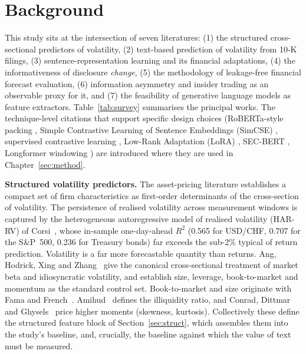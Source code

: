 \documentclass[logo,msc,ai]{infthesis}        %
\begin{document}
\chapter{Background}
\label{sec:sota}
This study sits at the intersection of seven literatures: (1) the structured cross-sectional predictors of volatility, (2) text-based prediction of volatility from 10-K filings, (3) sentence-representation learning and its financial adaptations, (4) the informativeness of disclosure \emph{change}, (5) the methodology of leakage-free financial forecast evaluation, (6) information asymmetry and insider trading as an observable proxy for it, and (7) the feasibility of generative language models as feature extractors. Table~\ref{tab:survey} summarises the principal works. The technique-level citations that support specific design choices (RoBERTa-style packing \cite{liu2019roberta}, Simple Contrastive Learning of Sentence Embeddings (SimCSE) \cite{gao2021simcse}, supervised contrastive learning \cite{khosla2020supervised}, Low-Rank Adaptation (LoRA) \cite{hu2022lora}, SEC-BERT \cite{loukas2022finer}, Longformer windowing \cite{beltagy2020longformer}) are introduced where they are used in Chapter~\ref{sec:method}.

\textbf{Structured volatility predictors.} The asset-pricing literature establishes a compact set of firm characteristics as first-order determinants of the cross-section of volatility. The persistence of realised volatility across measurement windows is captured by the heterogeneous autoregressive model of realised volatility (HAR-RV) of Corsi~\cite{corsi2009simple}, whose in-sample one-day-ahead $R^2$ (0.565 for USD/CHF, 0.707 for the S\&P~500, 0.236 for Treasury bonds) far exceeds the sub-2\% typical of return prediction. Volatility is a far more forecastable quantity than returns. Ang, Hodrick, Xing and Zhang~\cite{ang2006cross} give the canonical cross-sectional treatment of market beta and idiosyncratic volatility, and establish size, leverage, book-to-market and momentum as the standard control set. Book-to-market and size originate with Fama and French~\cite{fama1992cross}. Amihud~\cite{amihud2002illiquidity} defines the illiquidity ratio, and Conrad, Dittmar and Ghysels~\cite{conrad2013ex} price higher moments (skewness, kurtosis). Collectively these define the structured feature block of Section~\ref{sec:struct}, which assembles them into the study's baseline, and, crucially, the baseline against which the value of text must be measured.
\end{document}
